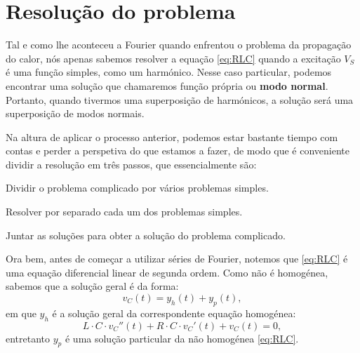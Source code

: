 \section{Resolução do problema}
Tal e como lhe aconteceu a Fourier quando enfrentou o problema da propagação do calor, nós apenas sabemos resolver a equação \eqref{eq:RLC} quando a excitação $V_S$ é uma função simples, como um harmónico. Nesse caso particular, podemos encontrar uma solução que chamaremos função própria ou \textbf{modo normal}. Portanto, quando tivermos uma superposição de harmónicos, a solução será uma superposição de modos normais.

Na altura de aplicar o processo anterior, podemos estar bastante tiempo com contas e perder a perspetiva do que estamos a fazer, de modo que é conveniente dividir a resolução em três passos, que essencialmente são:
\begin{mybox}
  \begin{enumerate}[{\bfseries [R1]}]
  \item Dividir o problema complicado por vários problemas simples.
  \item Resolver por separado cada um dos problemas simples.
  \item Juntar as soluções para obter a solução do problema complicado.
\end{enumerate}
\end{mybox}

Ora bem, antes de começar a utilizar séries de Fourier, notemos que \eqref{eq:RLC} é uma equação diferencial linear de segunda ordem. Como não é homogénea, sabemos que a solução geral é da forma:
\[
v_C(t) = y_h(t) + y_p(t),
\]
em que $y_h$ é a solução geral da correspondente equação homogénea:
\begin{equation}
  \label{eq:HomogeneaRLC}
  L\cdot C \cdot v_C '' (t) + R\cdot C\cdot v_C'(t) + v_C(t) = 0,
\end{equation}
 entretanto $y_p$ é uma solução particular da não homogénea \eqref{eq:RLC}.

